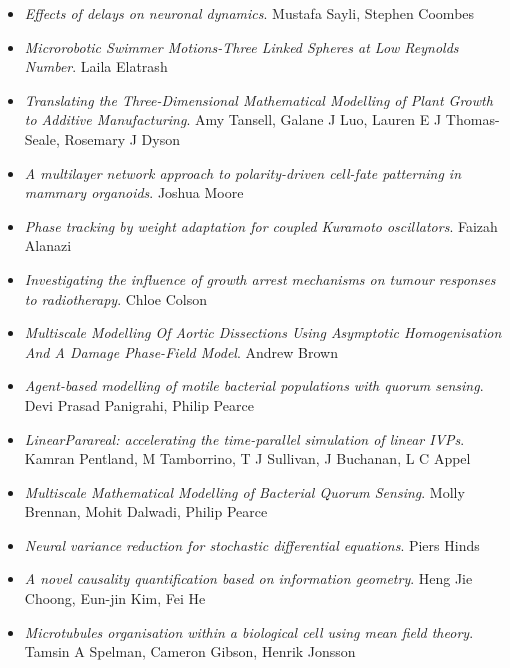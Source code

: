 \begin{itemize}
\item \textit{Effects of delays on neuronal dynamics}.
Mustafa Sayli, Stephen Coombes

\item \textit{Microrobotic Swimmer Motions-Three Linked Spheres at Low Reynolds Number}.
Laila Elatrash

\item \textit{Translating the Three-Dimensional Mathematical Modelling of Plant Growth to Additive Manufacturing}.
Amy Tansell, Galane J Luo, Lauren E J Thomas-Seale, Rosemary J Dyson

\item \textit{A multilayer network approach to polarity-driven cell-fate patterning in mammary organoids}.
Joshua Moore

\item \textit{Phase tracking by weight adaptation for coupled Kuramoto oscillators}.
Faizah Alanazi

\item \textit{Investigating the influence of growth arrest mechanisms on tumour responses to radiotherapy}.
Chloe Colson

\item \textit{Multiscale Modelling Of Aortic Dissections Using Asymptotic Homogenisation And A Damage Phase-Field Model}.
Andrew Brown

\item \textit{Agent-based modelling of motile bacterial populations with quorum sensing}.
Devi Prasad Panigrahi, Philip Pearce

\item \textit{LinearParareal: accelerating the time-parallel simulation of linear IVPs}.
Kamran Pentland, M Tamborrino, T J Sullivan, J Buchanan, L C Appel

\item \textit{Multiscale Mathematical Modelling of Bacterial Quorum Sensing}.
Molly Brennan, Mohit Dalwadi, Philip Pearce

\item \textit{Neural variance reduction for stochastic differential equations}.
Piers Hinds

\item \textit{A novel causality quantification based on information geometry}.
Heng Jie Choong, Eun-jin Kim, Fei He

\item \textit{Microtubules organisation within a biological cell using mean field theory}.
Tamsin A Spelman, Cameron Gibson, Henrik Jonsson


\end{itemize}
